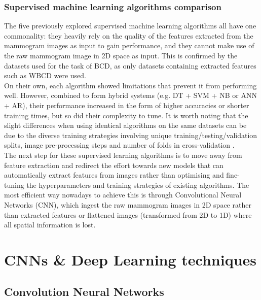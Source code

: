 \subsubsection{Supervised machine learning algorithms comparison}

The five previously explored supervised machine learning algorithms all have one commonality: they heavily rely on the quality of the features extracted from the mammogram images as input to gain performance, and they cannot make use of the raw mammogram image in 2D space as input. This is confirmed by the datasets used for the task of BCD, as only datasets containing extracted features such as WBCD were used.\\

On their own, each algorithm showed limitations that prevent it from performing well. However, combined to form hybrid systems (e.g. DT + SVM + NB or ANN + AR), their performance increased in the form of higher accuracies or shorter training times, but so did their complexity to tune. It is worth noting that the slight differences when using identical algorithms on the same datasets can be due to the diverse training strategies involving unique training/testing/validation splits, image pre-processing steps and number of folds in cross-validation \citep{Yue2018}.\\

The next step for these supervised learning algorithms is to move away from feature extraction and redirect the effort towards new models that can automatically extract features from images rather than optimising and fine-tuning the hyperparameters and training strategies of existing algorithms. The most efficient way nowadays to achieve this is through Convolutional Neural Networks (CNN), which ingest the raw mammogram images in 2D space rather than extracted features or flattened images (transformed from 2D to 1D) where all spatial information is lost.


\section{CNNs \& Deep Learning techniques}
\label{sec:litsurvey-DLtechniques-CNN}

\subsection{Convolution Neural Networks}


